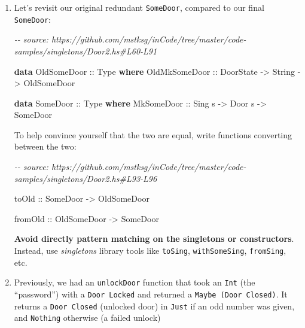 \documentclass[]{article}
\newenvironment{Shaded}{}{}
\newcommand{\CommentTok}[1]{\textcolor[rgb]{0.38,0.63,0.69}{\textit{#1}}}
\newcommand{\DataTypeTok}[1]{\textcolor[rgb]{0.56,0.13,0.00}{#1}}
\newcommand{\KeywordTok}[1]{\textcolor[rgb]{0.00,0.44,0.13}{\textbf{#1}}}
\newcommand{\NormalTok}[1]{#1}
\newcommand{\OtherTok}[1]{\textcolor[rgb]{0.00,0.44,0.13}{#1}}
\begin{document}
\begin{enumerate}
\def\labelenumi{\arabic{enumi}.}
\item
  Let's revisit our original redundant \texttt{SomeDoor}, compared to our final
  \texttt{SomeDoor}:

\begin{Shaded}
\begin{Highlighting}[]
\CommentTok{{-}{-} source: https://github.com/mstksg/inCode/tree/master/code{-}samples/singletons/Door2.hs\#L60{-}L91}

\KeywordTok{data} \DataTypeTok{OldSomeDoor}\OtherTok{ ::} \DataTypeTok{Type} \KeywordTok{where}
    \DataTypeTok{OldMkSomeDoor}\OtherTok{ ::} \DataTypeTok{DoorState} \OtherTok{{-}\textgreater{}} \DataTypeTok{String} \OtherTok{{-}\textgreater{}} \DataTypeTok{OldSomeDoor}

\KeywordTok{data} \DataTypeTok{SomeDoor}\OtherTok{ ::} \DataTypeTok{Type} \KeywordTok{where}
    \DataTypeTok{MkSomeDoor}\OtherTok{ ::} \DataTypeTok{Sing}\NormalTok{ s }\OtherTok{{-}\textgreater{}} \DataTypeTok{Door}\NormalTok{ s }\OtherTok{{-}\textgreater{}} \DataTypeTok{SomeDoor}
\end{Highlighting}
\end{Shaded}

  To help convince yourself that the two are equal, write functions converting
  between the two:

\begin{Shaded}
\begin{Highlighting}[]
\CommentTok{{-}{-} source: https://github.com/mstksg/inCode/tree/master/code{-}samples/singletons/Door2.hs\#L93{-}L96}

\OtherTok{toOld ::} \DataTypeTok{SomeDoor} \OtherTok{{-}\textgreater{}} \DataTypeTok{OldSomeDoor}

\OtherTok{fromOld ::} \DataTypeTok{OldSomeDoor} \OtherTok{{-}\textgreater{}} \DataTypeTok{SomeDoor}
\end{Highlighting}
\end{Shaded}

  \textbf{Avoid directly pattern matching on the singletons or constructors}.
  Instead, use \emph{singletons} library tools like \texttt{toSing},
  \texttt{withSomeSing}, \texttt{fromSing}, etc.
\item
  Previously, we had an \texttt{unlockDoor} function that took an \texttt{Int}
  (the ``password'') with a \texttt{Door\ \textquotesingle{}Locked} and returned
  a \texttt{Maybe\ (Door\ \textquotesingle{}Closed)}. It returns a
  \texttt{Door\ \textquotesingle{}Closed} (unlocked door) in \texttt{Just} if an
  odd number was given, and \texttt{Nothing} otherwise (a failed unlock)


\end{enumerate}
\end{document}
